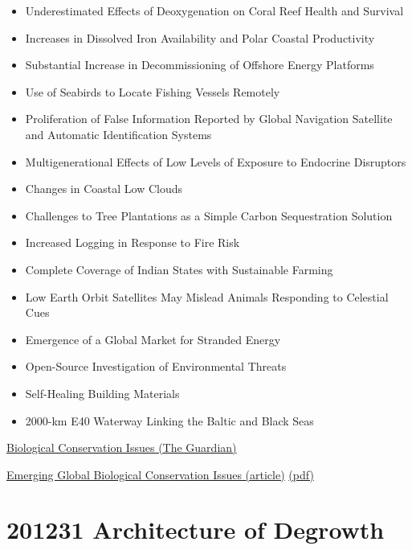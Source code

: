 \documentclass[
]{book}
\begin{document}
\begin{itemize}
\item
  Underestimated Effects of Deoxygenation on Coral Reef Health and Survival
\item
  Increases in Dissolved Iron Availability and Polar Coastal Productivity
\item
  Substantial Increase in Decommissioning of Offshore Energy Platforms
\item
  Use of Seabirds to Locate Fishing Vessels Remotely
\item
  Proliferation of False Information Reported by Global Navigation Satellite and Automatic
  Identification Systems
\item
  Multigenerational Effects of Low Levels of Exposure to Endocrine Disruptors
\item
  Changes in Coastal Low Clouds
\item
  Challenges to Tree Plantations as a Simple Carbon Sequestration Solution
\item
  Increased Logging in Response to Fire Risk
\item
  Complete Coverage of Indian States with Sustainable Farming
\item
  Low Earth Orbit Satellites May Mislead Animals Responding to Celestial Cues
\item
  Emergence of a Global Market for Stranded Energy
\item
  Open-Source Investigation of Environmental Threats
\item
  Self-Healing Building Materials
\item
  2000-km E40 Waterway Linking the Baltic and Black Seas
\end{itemize}

\href{https://www.theguardian.com/environment/2020/dec/28/seabird-patrols-to-self-healing-buildings-the-15-conservation-stories-to-watch-in-2021}{Biological Conservation Issues (The Guardian)}

\href{https://www.cell.com/trends/ecology-evolution/fulltext/S0169-5347(20)30306-2}{Emerging Global Biological Conservation Issues (article)}
\href{/pdf/Sutherland_2020_Horizon_Scan_Biological_Conservation_Issues.pdf}{(pdf)}

\hypertarget{architecture-of-degrowth}{%
\section{201231 Architecture of Degrowth}\label{architecture-of-degrowth}}
\end{document}
